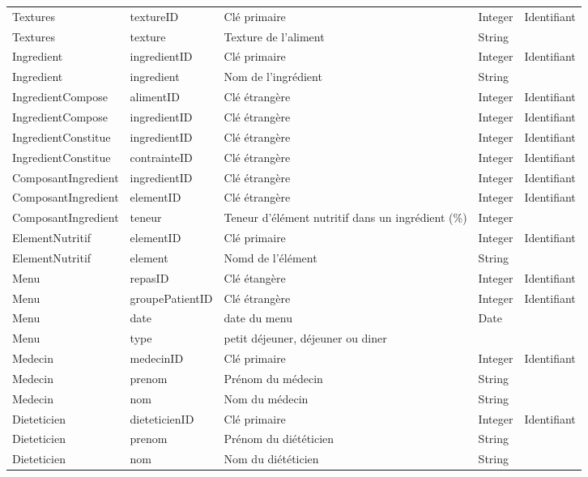 \begin{longtable}{llp{5cm}ll}
  Textures & textureID & Clé primaire & Integer & Identifiant \\
  Textures & texture & Texture de l'aliment & String & \\ \hline

  Ingredient & ingredientID & Clé primaire & Integer & Identifiant \\
  Ingredient & ingredient & Nom de l'ingrédient & String &  \\ \hline
  IngredientCompose & alimentID & Clé étrangère & Integer & Identifiant \\
  IngredientCompose & ingredientID & Clé étrangère & Integer & Identifiant \\ \hline
  IngredientConstitue & ingredientID & Clé étrangère & Integer & Identifiant \\
  IngredientConstitue & contrainteID & Clé étrangère & Integer & Identifiant \\ \hline

  ComposantIngredient & ingredientID & Clé étrangère & Integer & Identifiant \\
  ComposantIngredient & elementID & Clé étrangère & Integer & Identifiant \\
  ComposantIngredient & teneur & Teneur d'élément nutritif dans un ingrédient (\%) & Integer & \\ \hline

  ElementNutritif & elementID & Clé primaire & Integer & Identifiant \\
  ElementNutritif & element & Nomd de l'élément & String &  \\ \hline

  Menu & repasID & Clé étangère & Integer & Identifiant \\
  Menu & groupePatientID & Clé étrangère & Integer & Identifiant \\
  Menu & date & date du menu & Date & \\
  Menu & type & petit déjeuner, déjeuner ou diner \\ \hline

  Medecin & medecinID & Clé primaire & Integer & Identifiant \\
  Medecin & prenom & Prénom du médecin & String & \\
  Medecin & nom & Nom du médecin & String & \\ \hline

  Dieteticien & dieteticienID & Clé primaire & Integer & Identifiant \\
  Dieteticien & prenom & Prénom du diététicien & String & \\
  Dieteticien & nom & Nom du diététicien & String & \\ \hline


\end{longtable}
